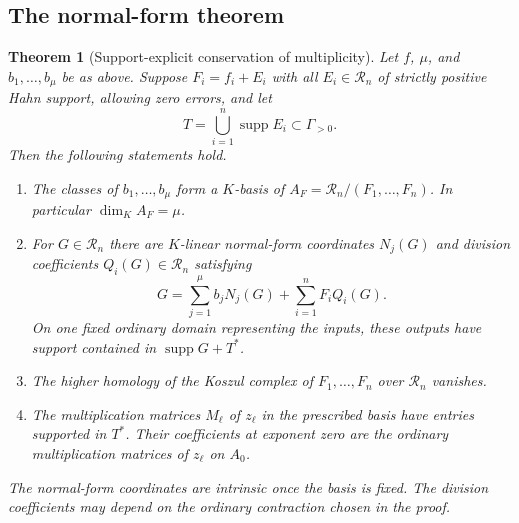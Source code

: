 \documentclass[11pt]{article}
\newtheorem{theorem}{Theorem}[section]
\theoremstyle{definition}
\newcommand{\RR}{\mathscr R}
\newcommand{\supp}{\operatorname{supp}}
\begin{document}
\subsection{The normal-form theorem}
\begin{theorem}[Support-explicit conservation of multiplicity]\label{thm:conservation}
Let $f$, $\mu$, and $b_1,\ldots,b_\mu$ be as above. Suppose $F_i=f_i+E_i$ with all $E_i\in\RR_n$ of strictly positive Hahn support, allowing zero errors, and let
\[
 T=\bigcup_{i=1}^{n}\supp E_i\subset\Gamma_{>0}.
\]
Then the following statements hold.
\begin{enumerate}
\item The classes of $b_1,\ldots,b_\mu$ form a $K$-basis of
$A_F=\RR_n/(F_1,\ldots,F_n)$. In particular $\dim_KA_F=\mu$.
\item For $G\in\RR_n$ there are $K$-linear normal-form coordinates $N_j(G)$ and division coefficients $Q_i(G)\in\RR_n$ satisfying
\begin{equation}\label{eq:normalform}
 G=\sum_{j=1}^{\mu}b_jN_j(G)+\sum_{i=1}^{n}F_iQ_i(G).
\end{equation}
On one fixed ordinary domain representing the inputs, these outputs have support contained in $\supp G+T^*$.
\item The higher homology of the Koszul complex of $F_1,\ldots,F_n$ over $\RR_n$ vanishes.
\item The multiplication matrices $M_\ell$ of $z_\ell$ in the prescribed basis have entries supported in $T^*$. Their coefficients at exponent zero are the ordinary multiplication matrices of $z_\ell$ on $A_0$.
\end{enumerate}
The normal-form coordinates are intrinsic once the basis is fixed. The division coefficients may depend on the ordinary contraction chosen in the proof.
\end{theorem}
\end{document}
